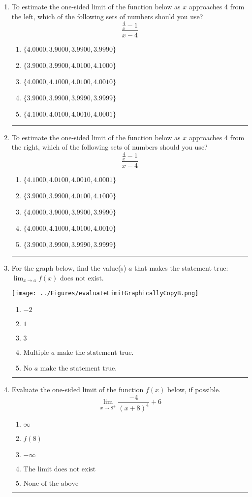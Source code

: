 \documentclass[14pt]{extbook}
\newcommand{\litem}[1]{\item#1\hspace*{-1cm}\rule{\textwidth}{0.4pt}}
\begin{document}
\begin{enumerate}
{\begin{enumerate}[label=\Alph*.]
\end{enumerate} }
\litem{
To estimate the one-sided limit of the function below as $x$ approaches 4 from the left, which of the following sets of numbers should you use?\[ \frac{\frac{4}{x} - 1}{x - 4} \]\begin{enumerate}[label=\Alph*.]
\item \( \{ 4.0000, 3.9000, 3.9900, 3.9990 \} \)
\item \( \{ 3.9000, 3.9900, 4.0100, 4.1000 \} \)
\item \( \{ 4.0000, 4.1000, 4.0100, 4.0010 \} \)
\item \( \{ 3.9000, 3.9900, 3.9990, 3.9999 \} \)
\item \( \{ 4.1000, 4.0100, 4.0010, 4.0001 \} \)

\end{enumerate} }
\litem{
To estimate the one-sided limit of the function below as $x$ approaches 4 from the right, which of the following sets of numbers should you use?\[ \frac{\frac{4}{x} - 1}{x - 4} \]\begin{enumerate}[label=\Alph*.]
\item \( \{ 4.1000, 4.0100, 4.0010, 4.0001 \} \)
\item \( \{ 3.9000, 3.9900, 4.0100, 4.1000 \} \)
\item \( \{ 4.0000, 3.9000, 3.9900, 3.9990 \} \)
\item \( \{ 4.0000, 4.1000, 4.0100, 4.0010 \} \)
\item \( \{ 3.9000, 3.9900, 3.9990, 3.9999 \} \)

\end{enumerate} }
\litem{
For the graph below, find the value(s) $a$ that makes the statement true: $ \displaystyle \lim_{x \rightarrow a} f(x)$ does not exist.
\begin{center}
    \texttt{[image: ../Figures/evaluateLimitGraphicallyCopyB.png]}
\end{center}
\begin{enumerate}[label=\Alph*.]
\item \( -2 \)
\item \( 1 \)
\item \( 3 \)
\item \( \text{Multiple } a \text{ make the statement true}. \)
\item \( \text{No } a \text{ make the statement true}. \)

\end{enumerate} }
\litem{
Evaluate the one-sided limit of the function $f(x)$ below, if possible.\[ \lim_{x \rightarrow 8^+} \frac{-4}{(x+8)^4}+6 \]\begin{enumerate}[label=\Alph*.]
\item \( \infty \)
\item \( f(8) \)
\item \( -\infty \)
\item \( \text{The limit does not exist} \)
\item \( \text{None of the above} \)


\end{enumerate}}
\end{enumerate}
\end{document}
